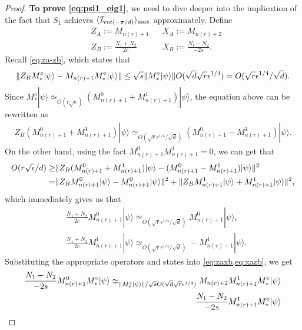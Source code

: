 \documentclass[11pt,letterpaper]{article}
\newcommand{\ket}[1]{|#1\rangle}
\DeclarePairedDelimiter{\norm}{\lVert}{\rVert}
\DeclarePairedDelimiter{\ip}{\langle}{\rangle}
\newcommand{\1}{\mathbb{1}}
\newcommand{\nr}{n(r)}
\newcommand{\I}{\mathcal{I}}
\newcommand{\se}{\sqrt{\epsilon}}
\newcommand{\qe}{\epsilon^{1/4}}
\newcommand{\sd}{\sqrt{d}}
\newcommand{\sr}{\sqrt{r}}
\newcommand{\appd}[1]{\simeq_{#1}}
\theoremstyle{definition}
\begin{document}
\begin{proof}
	\textbf{To prove \cref{eq:psi1_eig1}},
	we need to dive deeper into the implication of the fact that $S_1$ achieves $\ip{\I_{\cot(-\pi/d)}}_{\max}$ approximately.
	Define
	\begin{align}
		&Z_A  := M_{\nr+1} && X_A := M_{\nr+2} \\
		&Z_B := \frac{N_1+N_2}{2c} && X_B := \frac{N_1-N_2}{-2s}.
	\end{align}
	Recall \cref{eq:za-zb}, which states that
	\begin{align*}
		\norm{Z_B M_\ast^\diamond \ket{\psi} - M_{\nr+1}M_\ast^\diamond \ket{\psi}} \leq 
		\sqrt{s}\norm{M_\ast^\diamond \ket{\psi}} O(\sd \sr \qe)
		= O(\sr \qe/ \sd ).
	\end{align*}
	Since $M_\ast^\diamond \ket{\psi} \appd{O(r\se)} (M_{\nr+1}^0 + M_{\nr+1}^1) \ket{\psi}$,
	the equation above can be rewritten as 
	\begin{align*}
		Z_B (M_{\nr+1}^0 + M_{\nr+1}^1) \ket{\psi} \appd{O(\sr \qe / \sd )} (M_{\nr+1}^0 - M_{\nr+1}^1) \ket{\psi}.
	\end{align*}
	On the other hand, using the fact $M_{\nr+1}^0 M_{\nr+1}^1 = 0$, we can get that
	\begin{align*}
		O(r\se/d) \geq &\norm{Z_B (M_{\nr+1}^0 + M_{\nr+1}^1) \ket{\psi} - (M_{\nr+1}^0 - M_{\nr+1}^1) \ket{\psi}}^2\\
		=&\norm{ Z_BM_{\nr+1}^0 \ket{\psi} - M_{\nr+1}^0\ket{\psi}}^2 + \norm{ Z_BM_{\nr+1}^1 \ket{\psi} + M_{\nr+1}^1\ket{\psi}}^2,
	\end{align*}
	which immediately gives us that 
	\begin{align}
		&\frac{N_1+N_2}{2c} M_{\nr+1}^0\ket{\psi} \appd{O( \sr \qe /\sd)} M_{\nr+1}^0 \ket{\psi},\\
		&\frac{N_1+N_2}{2c} M_{\nr+1}^1\ket{\psi} \appd{O( \sr \qe /\sd)} -M_{\nr+1}^1 \ket{\psi}.
	\end{align}
		Substituting the appropriate operators and states into \cref{eq:zaxb,eq:xazb}, we get
	\begin{align*}
		\frac{N_1-N_2}{-2s} M_{\nr+1}^0M_\ast^\diamond \ket{\psi} 
		\appd{\norm{M_\ast^\diamond\ket{\psi}}/\sqrt{s} O(\sd \sr \qe)}M_{\nr+2} M_{\nr+1}^1M_\ast^\diamond\ket{\psi}\\
		\frac{N_1 -N_2}{-2s} M_{\nr+1}^1M_\ast^\diamond \ket{\psi}  

\end{align*}
\end{proof}
\end{document}
